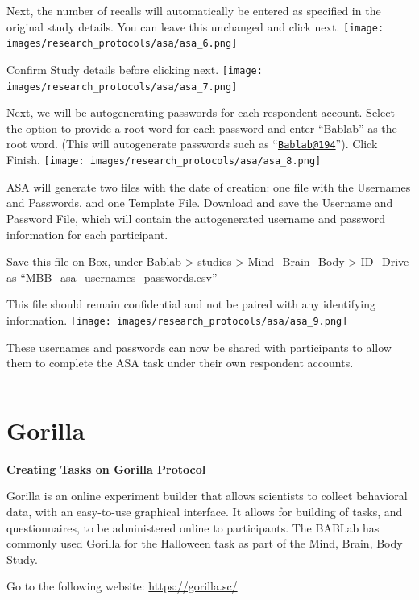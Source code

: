 \documentclass[
]{book}
\begin{document}
Next, the number of recalls will automatically be entered as specified in the original study details. You can leave this unchanged and click next.
\texttt{[image: images/research\_protocols/asa/asa\_6.png]}

Confirm Study details before clicking next.
\texttt{[image: images/research\_protocols/asa/asa\_7.png]}

Next, we will be autogenerating passwords for each respondent account. Select the option to provide a root word for each password and enter ``Bablab'' as the root word. (This will autogenerate passwords such as ``\href{mailto:Bablab@194}{\nolinkurl{Bablab@194}}''). Click Finish.
\texttt{[image: images/research\_protocols/asa/asa\_8.png]}

ASA will generate two files with the date of creation: one file with the Usernames and Passwords, and one Template File. Download and save the Username and Password File, which will contain the autogenerated username and password information for each participant.

Save this file on Box, under Bablab \textgreater{} studies \textgreater{} Mind\_Brain\_Body \textgreater{} ID\_Drive as ``MBB\_asa\_usernames\_passwords.csv''

This file should remain confidential and not be paired with any identifying information.
\texttt{[image: images/research\_protocols/asa/asa\_9.png]}

These usernames and passwords can now be shared with participants to allow them to complete the ASA task under their own respondent accounts.

\begin{center}\rule{0.5\linewidth}{0.5pt}\end{center}

\hypertarget{gorilla}{%
\section{Gorilla}\label{gorilla}}

\textbf{Creating Tasks on Gorilla Protocol}

Gorilla is an online experiment builder that allows scientists to collect behavioral data, with an easy-to-use graphical interface. It allows for building of tasks, and questionnaires, to be administered online to participants. The BABLab has commonly used Gorilla for the Halloween task as part of the Mind, Brain, Body Study.

Go to the following website: \url{https://gorilla.sc/}
\end{document}
